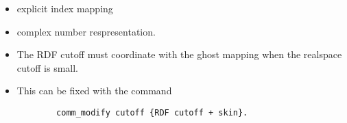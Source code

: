 \documentclass[11pt, a4paper]{article}
\begin{document}
\begin{itemize}
    \item explicit index mapping
    \item complex number respresentation.
\end{itemize}

\begin{itemize}
    \item The RDF cutoff must coordinate with the ghost mapping when the realspace cutoff is small.
    \item This can be fixed with the command
    \begin{lstlisting}
        comm_modify cutoff {RDF cutoff + skin}.
    \end{lstlisting}
\end{itemize}




\end{document}
